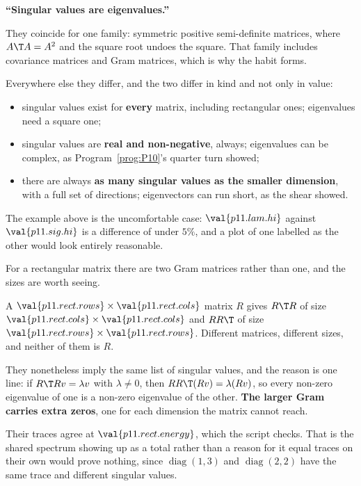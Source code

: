 \begin{trapbox}
\textbf{\enquote{Singular values are eigenvalues.}}

They coincide for one family: symmetric positive semi-definite matrices, where
$A\T A = A^{2}$ and the square root undoes the square. That family includes
covariance matrices and Gram matrices, which is why the habit forms.

Everywhere else they differ, and the two differ in kind and not only in value:

\begin{itemize}
\item singular values exist for \textbf{every} matrix, including rectangular
  ones; eigenvalues need a square one;
\item singular values are \textbf{real and non-negative}, always; eigenvalues
  can be complex, as Program~\ref{prog:P10}'s quarter turn showed;
\item there are always \textbf{as many singular values as the smaller
  dimension}, with a full set of directions; eigenvectors can run short, as the
  shear showed.
\end{itemize}

The example above is the uncomfortable case: $\val{p11.lam.hi}$ against
$\val{p11.sig.hi}$ is a difference of under $5\%$, and a plot of one labelled
as the other would look entirely reasonable.
\end{trapbox}

\begin{fr}
For a rectangular matrix there are two Gram matrices rather than one, and the
sizes are worth seeing.

A $\val{p11.rect.rows} \times \val{p11.rect.cols}$ matrix $R$ gives
$R\T R$ of size $\val{p11.rect.cols} \times \val{p11.rect.cols}$ and $RR\T$ of
size $\val{p11.rect.rows} \times \val{p11.rect.rows}$. Different matrices,
different sizes, and neither of them is $R$.

They nonetheless imply the same list of singular values, and the reason is one
line: if $R\T R v = \lambda v$ with $\lambda \ne 0$, then
$RR\T(Rv) = \lambda(Rv)$, so every non-zero eigenvalue of one is a non-zero
eigenvalue of the other. \textbf{The larger Gram carries extra zeros}, one for
each dimension the matrix cannot reach.

Their traces agree at $\val{p11.rect.energy}$, which the script checks. That is
the shared spectrum showing up as a total rather than a reason for it \dash{}
equal traces on their own would prove nothing, since $\operatorname{diag}(1, 3)$
and $\operatorname{diag}(2, 2)$ have the same trace and different singular
values.
\end{fr}

